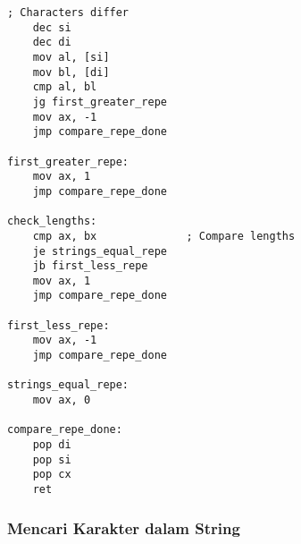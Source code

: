 \documentclass[../main.tex]{subfiles}
\begin{document}
\begin{lstlisting}[language={[x86masm]Assembler}, caption=Membandingkan String, label={lst:string-compare}]
    ; Characters differ
    dec si
    dec di
    mov al, [si]
    mov bl, [di]
    cmp al, bl
    jg first_greater_repe
    mov ax, -1
    jmp compare_repe_done
    
first_greater_repe:
    mov ax, 1
    jmp compare_repe_done
    
check_lengths:
    cmp ax, bx              ; Compare lengths
    je strings_equal_repe
    jb first_less_repe
    mov ax, 1
    jmp compare_repe_done
    
first_less_repe:
    mov ax, -1
    jmp compare_repe_done
    
strings_equal_repe:
    mov ax, 0
    
compare_repe_done:
    pop di
    pop si
    pop cx
    ret
                \end{lstlisting}

            \subsubsection{Mencari Karakter dalam String}
\end{document}
